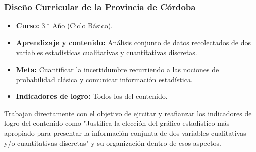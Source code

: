 \documentclass[11pt,a4paper]{article}
\begin{document}
\subsubsection{Diseño Curricular de la Provincia de Córdoba}
\begin{itemize}
    \item \textbf{Curso:} 3.$^{\circ}$ Año (Ciclo Básico).
    \item \textbf{Aprendizaje y contenido:} Análisis conjunto de datos recolectados de dos variables estadísticas cualitativas y cuantitativas discretas.
    \item \textbf{Meta:} Cuantificar la incertidumbre recurriendo a las nociones de probabilidad clásica y comunicar información estadística.
    \item \textbf{Indicadores de logro:} Todos los del contenido.
\end{itemize}
Trabajan directamente con el objetivo de ejrcitar y reafianzar los indicadores de logro del contenido como "Justifica la elección del gráfico estadístico más apropiado para presentar la información conjunta de dos variables cualitativas y/o cuantitativas discretas" y su organización dentro de esos aspectos.
\end{document}
